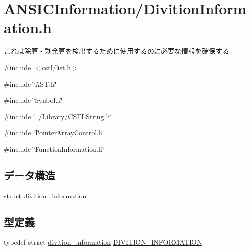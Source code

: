 \section{ANSICInformation/DivitionInformation.h}
\label{DivitionInformation_8h}


これは除算・剰余算を検出するために使用するのに必要な情報を確保する  


{\ttfamily \#include $<$cstl/list.h$>$}\par
{\ttfamily \#include \char`\"{}AST.h\char`\"{}}\par
{\ttfamily \#include \char`\"{}Synbol.h\char`\"{}}\par
{\ttfamily \#include \char`\"{}../Library/CSTLString.h\char`\"{}}\par
{\ttfamily \#include \char`\"{}PointerArrayControl.h\char`\"{}}\par
{\ttfamily \#include \char`\"{}FunctionInformation.h\char`\"{}}\par
\subsection*{データ構造}
\begin{DoxyCompactItemize}
\item 
struct \hyperlink{structdivition__information}{divition\_\-information}
\end{DoxyCompactItemize}
\subsection*{型定義}
\begin{DoxyCompactItemize}
\item 
typedef struct \hyperlink{structdivition__information}{divition\_\-information} \hyperlink{DivitionInformation_8h_afe33e19b368476a1c944f5b32da0a9d7}{DIVITION\_\-INFORMATION}
\end{DoxyCompactItemize}
